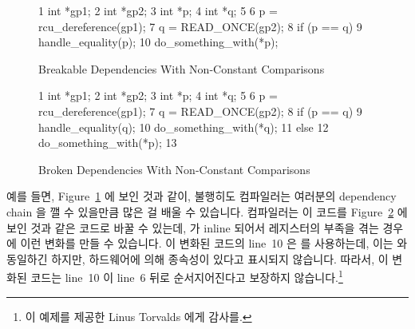 \begin{enumerate}
{\begin{figure}[tbp]
{ \scriptsize
\begin{verbbox}
 1 int *gp1;
 2 int *gp2;
 3 int *p;
 4 int *q;
 5
 6 p = rcu_dereference(gp1);
 7 q = READ_ONCE(gp2);
 8 if (p == q)
 9   handle_equality(p);
10 do_something_with(*p);
\end{verbbox}
}
\centering
\theverbbox
\caption{Breakable Dependencies With Non-Constant Comparisons}
\label{fig:advsync:Breakable Dependencies With Non-Constant Comparisons}
\end{figure}

\begin{figure}[tbp]
{ \scriptsize
\begin{verbbox}
 1 int *gp1;
 2 int *gp2;
 3 int *p;
 4 int *q;
 5
 6 p = rcu_dereference(gp1);
 7 q = READ_ONCE(gp2);
 8 if (p == q) {
 9   handle_equality(q);
10   do_something_with(*q);
11 } else {
12   do_something_with(*p);
13 }
\end{verbbox}
}
\centering
\theverbbox
\caption{Broken Dependencies With Non-Constant Comparisons}
\label{fig:advsync:Broken Dependencies With Non-Constant Comparisons}
\end{figure}

	예를 들면,
	Figure~\ref{fig:advsync:Breakable Dependencies With Non-Constant Comparisons}
	에 보인 것과 같이, 불행히도 컴파일러는 여러분의 dependency chain 을 깰
	수 있을만큼 많은 걸 배울 수 있습니다.
	컴파일러는 이 코드를
	Figure~\ref{fig:advsync:Broken Dependencies With Non-Constant Comparisons}
	에 보인 것과 같은 코드로 바꿀 수 있는데,  가
	inline 되어서 레지스터의 부족을 겪는 경우에 이런 변화를 만들 수
	있습니다.
	이 변화된 코드의 line~10 은  를 사용하는데, 이는  와
	동일하긴 하지만, 하드웨어에 의해 종속성이 있다고 표시되지 않습니다.
	따라서, 이 변화된 코드는 line~10 이 line~6 뒤로 순서지어진다고 보장하지
	않습니다.\footnote{
		이 예제를 제공한 Linus Torvalds 에게 감사를.}

} \QuickQuizEnd


\end{enumerate}
